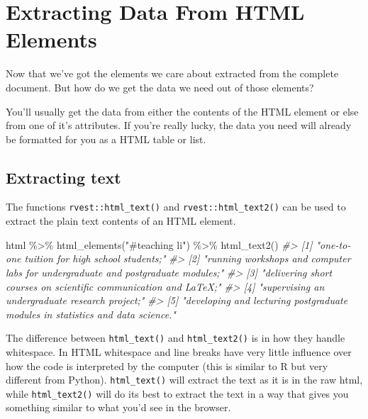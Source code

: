 \documentclass[
  12pt,
]{book}
\newenvironment{Shaded}{\begin{snugshade}}{\end{snugshade}}
\newcommand{\CommentTok}[1]{\textcolor[rgb]{0.56,0.35,0.01}{\textit{#1}}}
\newcommand{\FunctionTok}[1]{\textcolor[rgb]{0.00,0.00,0.00}{#1}}
\newcommand{\NormalTok}[1]{#1}
\newcommand{\SpecialCharTok}[1]{\textcolor[rgb]{0.00,0.00,0.00}{#1}}
\newcommand{\StringTok}[1]{\textcolor[rgb]{0.31,0.60,0.02}{#1}}
\begin{document}
\hypertarget{extracting-data-from-html-elements}{%
\section{Extracting Data From HTML Elements}\label{extracting-data-from-html-elements}}

Now that we've got the elements we care about extracted from the complete document. But how do we get the data we need out of those elements?

You'll usually get the data from either the contents of the HTML element or else from one of it's attributes. If you're really lucky, the data you need will already be formatted for you as a HTML table or list.

\hypertarget{extracting-text}{%
\subsection{Extracting text}\label{extracting-text}}

The functions \texttt{rvest::html\_text()} and \texttt{rvest::html\_text2()} can be used to extract the plain text contents of an HTML element.

\begin{Shaded}
\begin{Highlighting}[]
\NormalTok{html }\SpecialCharTok{\%\textgreater{}\%} 
  \FunctionTok{html\_elements}\NormalTok{(}\StringTok{"\#teaching li"}\NormalTok{) }\SpecialCharTok{\%\textgreater{}\%} 
  \FunctionTok{html\_text2}\NormalTok{()}
\CommentTok{\#\textgreater{} [1] "one{-}to{-}one tuition for high school students;"                                   }
\CommentTok{\#\textgreater{} [2] "running workshops and computer labs for undergraduate and postgraduate modules;"}
\CommentTok{\#\textgreater{} [3] "delivering short courses on scientific communication and LaTeX;"                }
\CommentTok{\#\textgreater{} [4] "supervising an undergraduate research project;"                                 }
\CommentTok{\#\textgreater{} [5] "developing and lecturing postgraduate modules in statistics and data science."}
\end{Highlighting}
\end{Shaded}

The difference between \texttt{html\_text()} and \texttt{html\_text2()} is in how they handle whitespace. In HTML whitespace and line breaks have very little influence over how the code is interpreted by the computer (this is similar to R but very different from Python). \texttt{html\_text()} will extract the text as it is in the raw html, while \texttt{html\_text2()} will do its best to extract the text in a way that gives you something similar to what you'd see in the browser.
\end{document}
